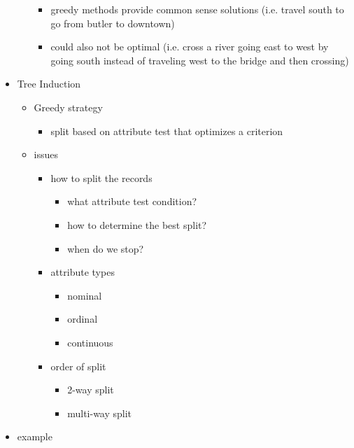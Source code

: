 \documentclass[12pt]{article}
\begin{document}
\begin{itemize}
\begin{itemize}
\begin{itemize}
					\item greedy methods provide common sense solutions (i.e. travel south to go from butler to downtown)
					\item could also not be optimal (i.e. cross a river going east to west by going south instead of traveling west to the bridge and then crossing)
				\end{itemize}
			\end{itemize}
		\item Tree Induction
			\begin{itemize}
				\item Greedy strategy 
				\begin{itemize}
					\item split based on attribute test that optimizes a criterion
				\end{itemize}
				\item issues
				\begin{itemize}
					\item how to split the records 
					\begin{itemize}
						\item what attribute test condition? 
						\item how to determine the best split?
						\item when do we stop?
					\end{itemize}
					\item attribute types 
					\begin{itemize}
						\item nominal
						\item ordinal
						\item continuous 
					\end{itemize}
					\item order of split 
					\begin{itemize}
						\item 2-way split
						\item multi-way split 
					\end{itemize}	
				\end{itemize}
			\end{itemize}
		\item example 


\end{itemize}
\end{document}
